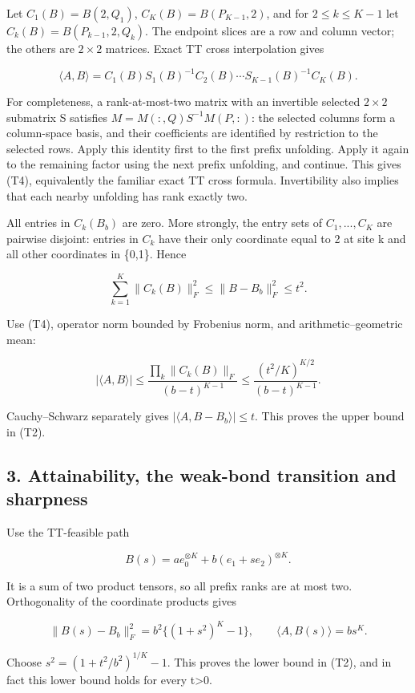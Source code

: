 \documentclass[
  11pt,
]{article}
\begin{document}
Let \(C_1(B)=B(2,Q_1)\), \(C_K(B)=B(P_{K-1},2)\), and for
\(2\le k\le K-1\) let \(C_k(B)=B(P_{k-1},2,Q_k)\). The endpoint slices
are a row and column vector; the others are \(2\times 2\) matrices.
Exact TT cross interpolation gives

\[
 \langle A,B\rangle=C_1(B)S_1(B)^{-1}C_2(B)
             \cdots S_{K-1}(B)^{-1}C_K(B). \tag{T4}
\]

For completeness, a rank-at-most-two matrix with an invertible selected
\(2\times 2\) submatrix S satisfies \(M=M(:,Q)S^{-1}M(P,:)\): the
selected columns form a column-space basis, and their coefficients are
identified by restriction to the selected rows. Apply this identity
first to the first prefix unfolding. Apply it again to the remaining
factor using the next prefix unfolding, and continue. This gives (T4),
equivalently the familiar exact TT cross formula. Invertibility also
implies that each nearby unfolding has rank exactly two.

All entries in \(C_k(B_b)\) are zero. More strongly, the entry sets of
\(C_1,...,C_K\) are pairwise disjoint: entries in \(C_k\) have their
only coordinate equal to 2 at site k and all other coordinates in
\{0,1\}. Hence

\[
 \sum_{k=1}^K\|C_k(B)\|_F^2\le\|B-B_b\|_F^2\le t^2.
\]

Use (T4), operator norm bounded by Frobenius norm, and
arithmetic--geometric mean:

\[
 |\langle A,B\rangle|
 \le\frac{\prod_k\|C_k(B)\|_F}{(b-t)^{K-1}}
 \le\frac{(t^2/K)^{K/2}}{(b-t)^{K-1}}.
\]

Cauchy--Schwarz separately gives \(|\langle A,B-B_b\rangle |\le t\).
This proves the upper bound in (T2).

\subsection{3. Attainability, the weak-bond transition and
sharpness}\label{attainability-the-weak-bond-transition-and-sharpness}

Use the TT-feasible path

\[
 B(s)=a e_0^{\otimes K}+b(e_1+s e_2)^{\otimes K}.
\]

It is a sum of two product tensors, so all prefix ranks are at most two.
Orthogonality of the coordinate products gives

\[
 \|B(s)-B_b\|_F^2=b^2\{(1+s^2)^K-1\},\qquad
 \langle A,B(s)\rangle=bs^K.
\]

Choose \(s^{2}=(1+t^{2}/b^{2})^{1/K}-1\). This proves the lower bound in
(T2), and in fact this lower bound holds for every t\textgreater0.
\end{document}
